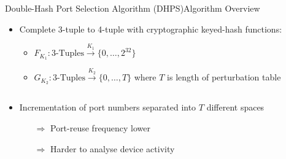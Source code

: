 \documentclass[aspectratio=169, hyperref={colorlinks=true, allcolors=SecondaryColor}, c]{beamer}
\begin{document}
	\begin{frame}[fragile]{Double-Hash Port Selection Algorithm (DHPS)}{Algorithm Overview}
		\begin{itemize}
			\item \alert{Complete 3-tuple to 4-tuple} with cryptographic keyed-hash functions:
			\begin{itemize}
				\scriptsize
				\item \( F_{K_1}: \text{3-Tuples} \xrightarrow{K_1} \{0, \ldots, 2^{32}\}\)
				\item \( G_{K_2}: \text{3-Tuples} \xrightarrow{K_2} \{0, \ldots, T\}\) where $T$ is length of \alert{perturbation table}
			\end{itemize}
		\end{itemize}
		\begin{columns}
			\begin{column}{0.5\textwidth}
				\begin{itemize}
					\item Incrementation of port numbers separated into \alert{$T$ different spaces}
					\begin{itemize}
						\item[\alert{$\Rightarrow$}] Port-reuse frequency lower\cite{larsenRecommendationsTransportProtocolPort2011} %
						\item[\alert{$\Rightarrow$}] Harder to analyse device activity %
					\end{itemize}
				\end{itemize}
			\end{column}
			\begin{column}{0.5\textwidth}
				\begin{center}
					\begin{adjustbox}{max width=\textwidth}
					\end{adjustbox}
				\end{center}
			\end{column}
		\end{columns}
	\end{frame}
\end{document}
